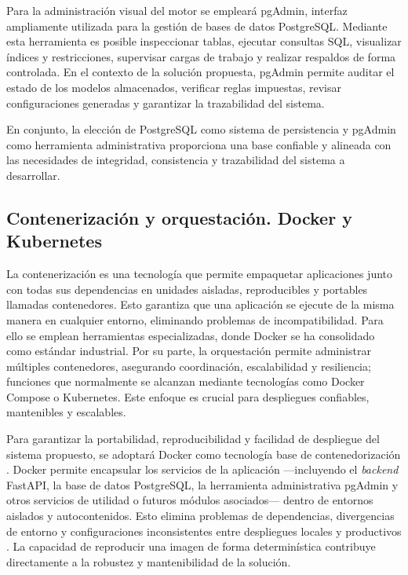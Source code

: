 Para la administración visual del motor se empleará pgAdmin, interfaz ampliamente 
utilizada para la gestión de bases de datos PostgreSQL. Mediante esta herramienta 
es posible inspeccionar tablas, ejecutar consultas \ac{SQL}, visualizar índices y 
restricciones, supervisar cargas de trabajo y realizar respaldos de forma controlada. 
En el contexto de la solución propuesta, pgAdmin permite auditar el estado de los 
modelos almacenados, verificar reglas impuestas, revisar configuraciones generadas 
y garantizar la trazabilidad del sistema.

En conjunto, la elección de PostgreSQL como sistema de persistencia y pgAdmin 
como herramienta administrativa proporciona una base confiable y alineada 
con las necesidades de integridad, consistencia y trazabilidad del sistema 
a desarrollar.
        
\subsection{Contenerización y orquestación. Docker y Kubernetes}

La contenerización es una tecnología que permite empaquetar aplicaciones junto con 
todas sus dependencias en unidades aisladas, reproducibles y portables llamadas 
contenedores. Esto garantiza que una aplicación se ejecute de la misma manera en 
cualquier entorno, eliminando problemas de incompatibilidad. Para ello se emplean 
herramientas especializadas, donde Docker se ha consolidado como estándar industrial. 
Por su parte, la orquestación permite administrar múltiples contenedores, asegurando 
coordinación, escalabilidad y resiliencia; funciones que normalmente se alcanzan 
mediante tecnologías como Docker Compose o Kubernetes. Este enfoque es crucial para 
despliegues confiables, mantenibles y escalables.

Para garantizar la portabilidad, reproducibilidad y facilidad de despliegue del 
sistema propuesto, se adoptará Docker como tecnología base de contenedorización 
\citep{boettiger2015introduction, docker2024docs}. 
Docker permite encapsular los servicios de la aplicación —incluyendo el \textit{backend} 
FastAPI, la base de datos PostgreSQL, la herramienta administrativa pgAdmin y
otros servicios de utilidad o futuros módulos asociados— dentro de entornos aislados 
y autocontenidos. Esto elimina problemas de dependencias, divergencias de entorno
y configuraciones inconsistentes entre despliegues locales y productivos 
\citep{boettiger2015introduction}.
La capacidad de reproducir una imagen de forma determinística contribuye directamente 
a la robustez y mantenibilidad de la solución.

